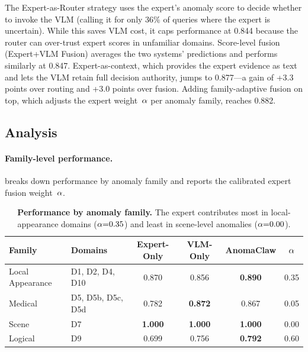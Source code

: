 The Expert-as-Router strategy uses the expert's anomaly score to decide whether to invoke the VLM (calling it for only 36\% of queries where the expert is uncertain).
While this saves VLM cost, it caps performance at 0.844 because the router can over-trust expert scores in unfamiliar domains.
Score-level fusion (Expert+VLM Fusion) averages the two systems' predictions and performs similarly at 0.847.
Expert-as-context, which provides the expert evidence as text and lets the VLM retain full decision authority, jumps to 0.877---a gain of +3.3 points over routing and +3.0 points over fusion.
Adding family-adaptive fusion on top, which adjusts the expert weight~$\alpha$ per anomaly family, reaches 0.882.


\subsection{Analysis}
\label{sec:analysis}

\paragraph{Family-level performance.}
 breaks down performance by anomaly family and reports the calibrated expert fusion weight~$\alpha$.

\begin{table}[t]
\centering
\caption{%
    \textbf{Performance by anomaly family.}
    The expert contributes most in local-appearance domains ($\alpha{=}0.35$) and least in scene-level anomalies ($\alpha{=}0.00$).
}
\label{tab:family_analysis}
\small
\begin{tabular}{@{}llcccc@{}}
\toprule
Family & Domains & Expert-Only & VLM-Only & AnomaClaw & $\alpha$ \\
\midrule
Local Appearance & D1, D2, D4, D10 & 0.870 & 0.856 & \textbf{0.890} & 0.35 \\
Medical          & D5, D5b, D5c, D5d & 0.782 & \textbf{0.872} & 0.867 & 0.05 \\
Scene            & D7               & \textbf{1.000} & \textbf{1.000} & \textbf{1.000} & 0.00 \\
Logical          & D9               & 0.699 & 0.756 & \textbf{0.792} & 0.60 \\
\bottomrule
\end{tabular}
\end{table}

